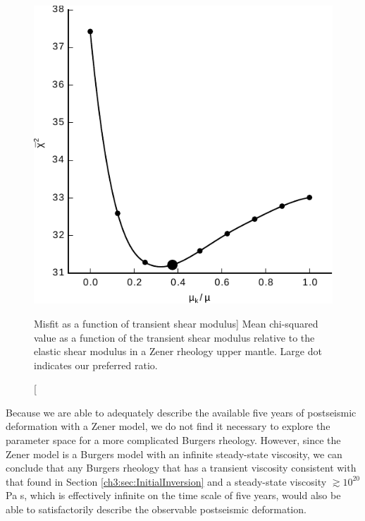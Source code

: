 \begin{figure}
\includegraphics[scale=1.0]{ch3/figures/2016jb013114-f13}
\caption
[Misfit as a function of transient shear modulus]
{Mean chi-squared value as a function of the transient shear
modulus relative to the elastic shear modulus in a Zener rheology
upper mantle. Large dot indicates our preferred ratio.}
\label{ch3:fig:ShearModulusRatio}
\end{figure}

Because we are able to adequately describe the available five years of
postseismic deformation with a Zener model, we do not find it
necessary to explore the parameter space for a more complicated
Burgers rheology.  However, since the Zener model is a Burgers model
with an infinite steady-state viscosity, we can conclude that any
Burgers rheology that has a transient viscosity consistent with that
found in Section \ref{ch3:sec:InitialInversion} and a steady-state
viscosity $\gtrsim10^{20}$ Pa s, which is effectively infinite on the
time scale of five years, would also be able to satisfactorily
describe the observable postseismic deformation.
  
